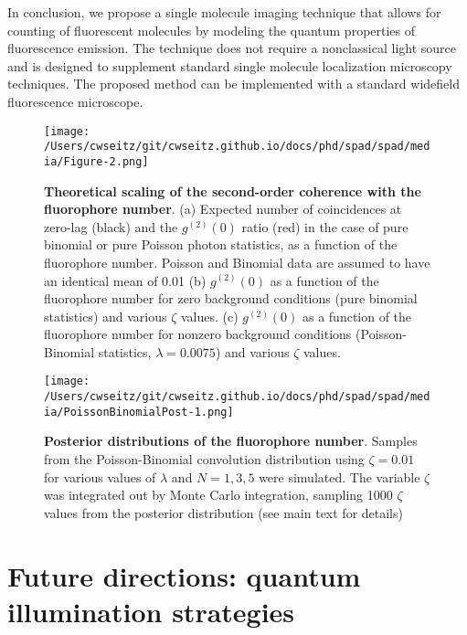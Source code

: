 In conclusion, we propose a single molecule imaging technique that allows for counting of fluorescent molecules by modeling the quantum properties of fluorescence emission. The technique does not require a nonclassical light source and is designed to supplement standard single molecule localization microscopy techniques. The proposed method can be implemented with a standard widefield fluorescence microscope.

\clearpage
\begin{figure}
\centering
\texttt{[image: /Users/cwseitz/git/cwseitz.github.io/docs/phd/spad/spad/media/Figure-2.png]}
\caption{\textbf{Theoretical scaling of the second-order coherence with the fluorophore number}. (a) Expected number of coincidences at zero-lag (black) and the $g^{(2)}(0)$ ratio (red) in the case of pure binomial or pure Poisson photon statistics, as a function of the fluorophore number. Poisson and Binomial data are assumed to have an identical mean of 0.01 (b) $g^{(2)}(0)$ as a function of the fluorophore number for zero background conditions (pure binomial statistics) and various $\zeta$ values. (c) $g^{(2)}(0)$ as a function of the fluorophore number for nonzero background conditions (Poisson-Binomial statistics, $\lambda=0.0075$) and various $\zeta$ values.}
\label{fig:binomvpoiss}
\end{figure}  


\begin{figure*}
\centering
\texttt{[image: /Users/cwseitz/git/cwseitz.github.io/docs/phd/spad/spad/media/PoissonBinomialPost-1.png]}
\caption{\textbf{Posterior distributions of the fluorophore number}. Samples from the Poisson-Binomial convolution distribution using $\zeta=0.01$ for various values of $\lambda$ and $N=1,3,5$ were simulated. The variable $\zeta$ was integrated out by Monte Carlo integration, sampling 1000 $\zeta$ values from the posterior distribution (see main text for details)}
\label{fig:fig9}
\end{figure*}    

\clearpage
\section{Future directions: quantum illumination strategies}

